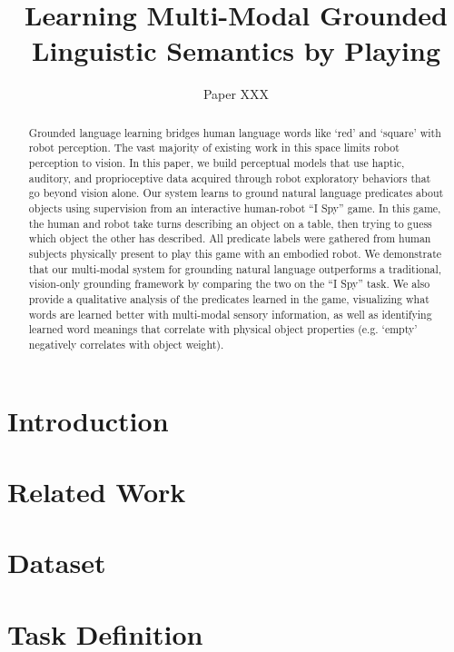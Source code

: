 \documentclass{article}
\title{Learning Multi-Modal Grounded Linguistic Semantics by Playing \ispy}
\author{Paper XXX}
\newcommand{\ispy}{``I Spy''\xspace}
\begin{document}
\maketitle

\begin{abstract}
Grounded language learning bridges human language words like `red' and `square' with robot perception.
The vast majority of existing work in this space limits robot perception to vision.
In this paper, we build perceptual models that use haptic, auditory, and proprioceptive data acquired through robot exploratory behaviors that go beyond vision alone.
Our system learns to ground natural language predicates about objects using supervision from an interactive human-robot \ispy game.
In this game, the human and robot take turns describing an object on a table, then trying to guess which object the other has described.
All predicate labels were gathered from human subjects physically present to play this game with an embodied robot.
We demonstrate that our multi-modal system for grounding natural language outperforms a traditional, vision-only grounding framework by comparing the two on the \ispy task.
We also provide a qualitative analysis of the predicates learned in the game, visualizing what words are learned better with multi-modal sensory information, as well as identifying learned word meanings that correlate with physical object properties (e.g. `empty' negatively correlates with object weight).
\end{abstract}

\section{Introduction}
\label{sec:introduction}
	

\section{Related Work}
\label{sec:relatedwork}
	

\section{Dataset}
\label{sec:dataset}
	

\section{Task Definition}
\label{sec:taskdefinition}
	
\end{document}
